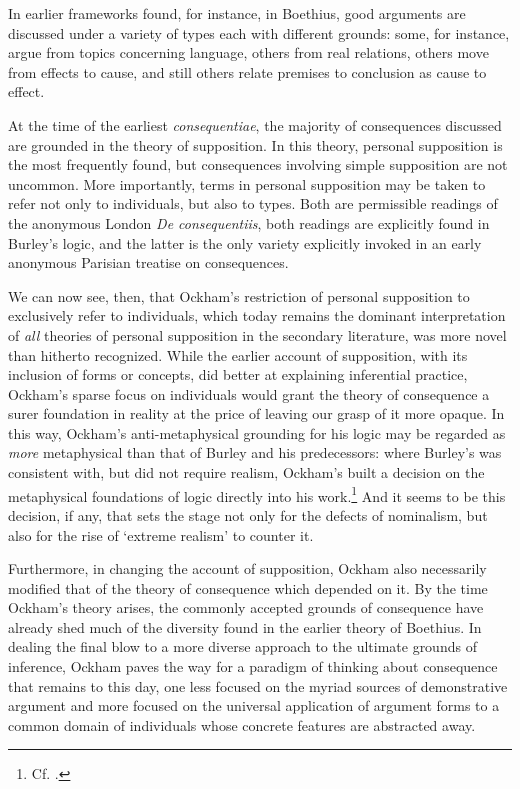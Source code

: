 \documentclass[a4paper, 11pt]{article}
\begin{document}
In earlier frameworks found, for instance, in Boethius, good arguments are discussed under a variety of types each with different grounds: some, for instance, argue from topics concerning language, others from real relations, others move from effects to cause, and still others relate premises to conclusion as cause to effect.

At the time of the earliest \emph{consequentiae}, the majority of consequences discussed are grounded in the theory of supposition. In this theory, personal supposition is the most frequently found, but consequences involving simple supposition are not uncommon. More importantly, terms in personal supposition may be taken to refer not only to individuals, but also to types. Both are permissible readings of the anonymous London \emph{De consequentiis}, both readings are explicitly found in Burley's logic, and the latter is the only variety explicitly invoked in an early anonymous Parisian treatise on consequences.

We can now see, then, that Ockham's restriction of personal supposition to exclusively refer to individuals, which today remains the dominant interpretation of \emph{all} theories of personal supposition in the secondary literature, was more novel than hitherto recognized. While the earlier account of supposition, with its inclusion of forms or concepts, did better at explaining inferential practice, Ockham's sparse focus on individuals would grant the theory of consequence a surer foundation in reality at the price of leaving our grasp of it more opaque. In this way, Ockham's anti-metaphysical grounding for his logic may be regarded as \emph{more} metaphysical than that of Burley and his predecessors: where Burley's was consistent with, but did not require realism, Ockham's built a decision on the metaphysical foundations of logic directly into his work.\footnote{Cf. \autocite{Read2007}.} And it seems to be this decision, if any, that sets the stage not only for the defects of nominalism, but also for the rise of `extreme realism' to counter it.


Furthermore, in changing the account of supposition, Ockham also necessarily modified that of the theory of consequence which depended on it. By the time Ockham's theory arises, the commonly accepted grounds of consequence have already shed much of the diversity found in the earlier theory of Boethius. In dealing the final blow to a more diverse approach to the ultimate grounds of inference, Ockham paves the way for a paradigm of thinking about consequence that remains to this day, one less focused on the myriad sources of demonstrative argument and more focused on the universal application of argument forms to a common domain of individuals whose concrete features are abstracted away. 
\end{document}
